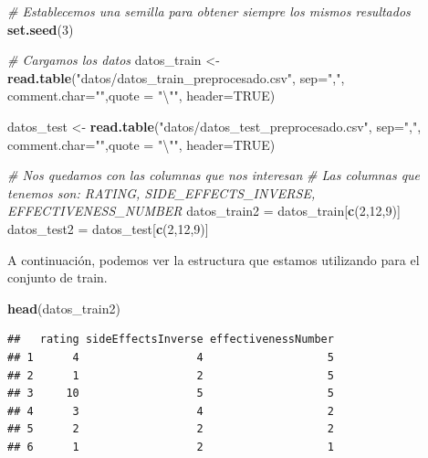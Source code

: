 \documentclass[spanish,]{article}
\newenvironment{Shaded}{\begin{snugshade}}{\end{snugshade}}
\newcommand{\KeywordTok}[1]{\textcolor[rgb]{0.13,0.29,0.53}{\textbf{#1}}}
\newcommand{\DataTypeTok}[1]{\textcolor[rgb]{0.13,0.29,0.53}{#1}}
\newcommand{\DecValTok}[1]{\textcolor[rgb]{0.00,0.00,0.81}{#1}}
\newcommand{\CharTok}[1]{\textcolor[rgb]{0.31,0.60,0.02}{#1}}
\newcommand{\StringTok}[1]{\textcolor[rgb]{0.31,0.60,0.02}{#1}}
\newcommand{\CommentTok}[1]{\textcolor[rgb]{0.56,0.35,0.01}{\textit{#1}}}
\newcommand{\OtherTok}[1]{\textcolor[rgb]{0.56,0.35,0.01}{#1}}
\newcommand{\NormalTok}[1]{#1}
\begin{document}
\begin{Shaded}
\begin{Highlighting}[]
\CommentTok{# Establecemos una semilla para obtener siempre los mismos resultados}
\KeywordTok{set.seed}\NormalTok{(}\DecValTok{3}\NormalTok{)}

\CommentTok{# Cargamos los datos}
\NormalTok{datos_train <-}\StringTok{ }\KeywordTok{read.table}\NormalTok{(}\StringTok{"datos/datos_train_preprocesado.csv"}\NormalTok{, }\DataTypeTok{sep=}\StringTok{","}\NormalTok{, }
                          \DataTypeTok{comment.char=}\StringTok{""}\NormalTok{,}\DataTypeTok{quote =} \StringTok{"}\CharTok{\textbackslash{}"}\StringTok{"}\NormalTok{, }\DataTypeTok{header=}\OtherTok{TRUE}\NormalTok{)}

\NormalTok{datos_test <-}\StringTok{ }\KeywordTok{read.table}\NormalTok{(}\StringTok{"datos/datos_test_preprocesado.csv"}\NormalTok{, }\DataTypeTok{sep=}\StringTok{","}\NormalTok{, }
                         \DataTypeTok{comment.char=}\StringTok{""}\NormalTok{,}\DataTypeTok{quote =} \StringTok{"}\CharTok{\textbackslash{}"}\StringTok{"}\NormalTok{, }\DataTypeTok{header=}\OtherTok{TRUE}\NormalTok{)}

\CommentTok{# Nos quedamos con las columnas que nos interesan }
\CommentTok{# Las columnas que tenemos son: RATING, SIDE_EFFECTS_INVERSE, EFFECTIVENESS_NUMBER}
\NormalTok{datos_train2 =}\StringTok{ }\NormalTok{datos_train[}\KeywordTok{c}\NormalTok{(}\DecValTok{2}\NormalTok{,}\DecValTok{12}\NormalTok{,}\DecValTok{9}\NormalTok{)]}
\NormalTok{datos_test2 =}\StringTok{ }\NormalTok{datos_test[}\KeywordTok{c}\NormalTok{(}\DecValTok{2}\NormalTok{,}\DecValTok{12}\NormalTok{,}\DecValTok{9}\NormalTok{)]}
\end{Highlighting}
\end{Shaded}

A continuación, podemos ver la estructura que estamos utilizando para el
conjunto de train.

\begin{Shaded}
\begin{Highlighting}[]
\KeywordTok{head}\NormalTok{(datos_train2)}
\end{Highlighting}
\end{Shaded}

\begin{verbatim}
##   rating sideEffectsInverse effectivenessNumber
## 1      4                  4                   5
## 2      1                  2                   5
## 3     10                  5                   5
## 4      3                  4                   2
## 5      2                  2                   2
## 6      1                  2                   1
\end{verbatim}
\end{document}
